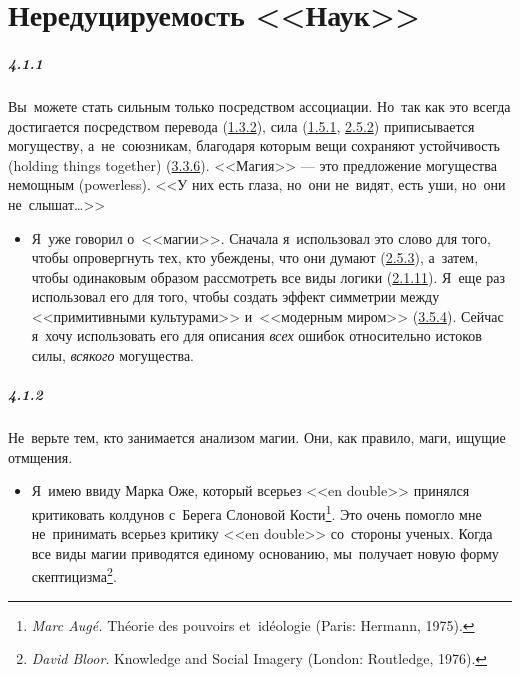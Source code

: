 \chapter{Нередуцируемость <<Наук>>}


\paragraph{4.1.1}\hypertarget{par:4.1.1}{} Вы~можете стать сильным только посредством ассоциации. Но~так как это всегда достигается посредством перевода (\hyperlink{par:1.3.2}{1.3.2}), сила (\hyperlink{par:1.5.1}{1.5.1}, \hyperlink{par:2.5.2}{2.5.2}) приписывается могуществу, а~не~союзникам, благодаря которым вещи сохраняют устойчивость (holding things together) (\hyperlink{par:3.3.6}{3.3.6}). <<Магия>> --- это предложение могущества немощным (powerless). <<У них есть глаза, но~они не~видят, есть уши, но~они не~слышат{\ldots}>>
	\begin{itemize}
	\item 
 Я~уже говорил о~<<магии>>. Сначала я~использовал это слово для того, чтобы опровергнуть тех, кто убеждены, что они думают (\hyperlink{par:2.5.3}{2.5.3}), а~затем, чтобы одинаковым образом рассмотреть все виды логики (\hyperlink{par:2.1.11}{2.1.11}). Я~еще раз использовал его для того, чтобы создать эффект симметрии между <<примитивными культурами>> и~<<модерным миром>> (\hyperlink{par:3.5.4}{3.5.4}). Сейчас я~хочу использовать его для описания {\itshape всех} ошибок относительно истоков силы, {\itshape всякого} могущества.
	\end{itemize}	


\paragraph{4.1.2}\hypertarget{par:4.1.2}{} Не~верьте тем, кто занимается анализом магии. Они, как правило, маги, ищущие отмщения.
	\begin{itemize}
	\item 
 Я~имею ввиду Марка Оже, который всерьез <<en double>> принялся критиковать колдунов с~Берега Слоновой Кости\footnote{{\itshape Marc Aug\'{e}.} Th\'{e}orie des pouvoirs et~id\'{e}ologie (Paris: Hermann, 1975).}. Это очень помогло мне не~принимать всерьез критику <<en double>> со~стороны ученых. Когда все виды магии приводятся единому основанию, мы~получает новую форму скептицизма\footnote{{\itshape David Bloor}. Knowledge and Social Imagery (London: Routledge, 1976).}.
	\end{itemize}	

